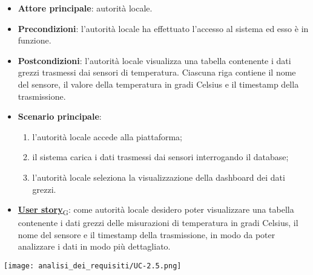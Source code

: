 \begin{itemize}
	\item \textbf{Attore principale}: autorità locale.
	\item \textbf{Precondizioni}: l'autorità locale ha effettuato l'accesso al sistema ed esso è in funzione.
	\item \textbf{Postcondizioni}: l'autorità locale visualizza una tabella contenente i dati grezzi trasmessi dai sensori di temperatura.
	      Ciascuna riga contiene il nome del sensore, il valore della temperatura in gradi Celsius e il timestamp della trasmissione.
	\item \textbf{Scenario principale}:
	      \begin{enumerate}
		      \item l'autorità locale accede alla piattaforma;
		      \item il sistema carica i dati trasmessi dai sensori interrogando il database;
		      \item l'autorità locale seleziona la visualizzazione della dashboard dei dati grezzi.
	      \end{enumerate}
	\item \href{https://7last.github.io/docs/rtb/documentazione-interna/glossario\#user-story}{\textbf{User story}\textsubscript{G}}:
	      come autorità locale desidero poter visualizzare una tabella contenente i dati grezzi delle misurazioni di temperatura
	      in gradi Celsius, il nome del sensore e il timestamp della trasmissione, in modo da poter analizzare i dati in modo più dettagliato.
\end{itemize}
\begin{center}
	\texttt{[image: analisi\_dei\_requisiti/UC-2.5.png]}
\end{center}

